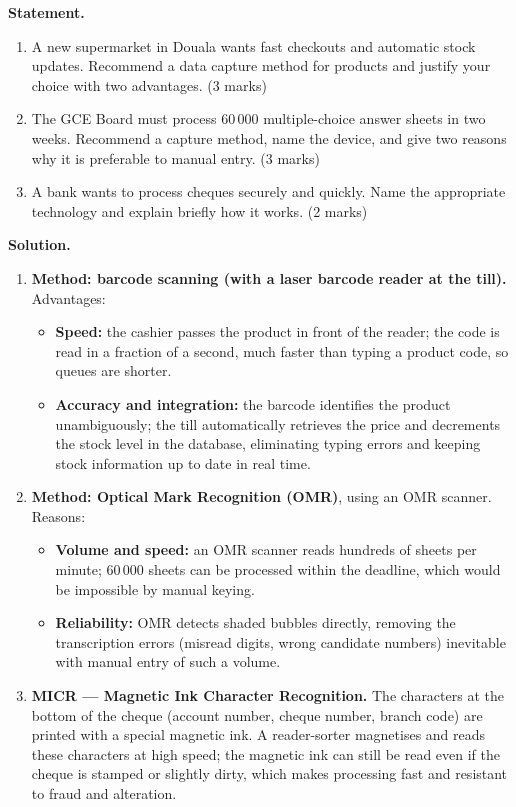\documentclass[11pt]{article}
\begin{document}
\begin{exoresolu}
\textbf{Statement.} 
\begin{enumerate}
\item[a)] A new supermarket in Douala wants fast checkouts and automatic stock updates. Recommend a data capture method for products and justify your choice with two advantages. \hfill (3 marks)
\item[b)] The GCE Board must process 60\,000 multiple-choice answer sheets in two weeks. Recommend a capture method, name the device, and give two reasons why it is preferable to manual entry. \hfill (3 marks)
\item[c)] A bank wants to process cheques securely and quickly. Name the appropriate technology and explain briefly how it works. \hfill (2 marks)
\end{enumerate}
\tcblower
\textbf{Solution.}
\begin{enumerate}
\item[a)] \textbf{Method: barcode scanning (with a laser barcode reader at the till).}
Advantages:
\begin{itemize}
\item \textbf{Speed:} the cashier passes the product in front of the reader; the code is read in a fraction of a second, much faster than typing a product code, so queues are shorter.
\item \textbf{Accuracy and integration:} the barcode identifies the product unambiguously; the till automatically retrieves the price and decrements the stock level in the database, eliminating typing errors and keeping stock information up to date in real time.
\end{itemize}
\item[b)] \textbf{Method: Optical Mark Recognition (OMR)}, using an OMR scanner.
Reasons:
\begin{itemize}
\item \textbf{Volume and speed:} an OMR scanner reads hundreds of sheets per minute; 60\,000 sheets can be processed within the deadline, which would be impossible by manual keying.
\item \textbf{Reliability:} OMR detects shaded bubbles directly, removing the transcription errors (misread digits, wrong candidate numbers) inevitable with manual entry of such a volume.
\end{itemize}
\item[c)] \textbf{MICR — Magnetic Ink Character Recognition.} The characters at the bottom of the cheque (account number, cheque number, branch code) are printed with a special magnetic ink. A reader-sorter magnetises and reads these characters at high speed; the magnetic ink can still be read even if the cheque is stamped or slightly dirty, which makes processing fast and resistant to fraud and alteration.
\end{enumerate}
\end{exoresolu}
\end{document}
